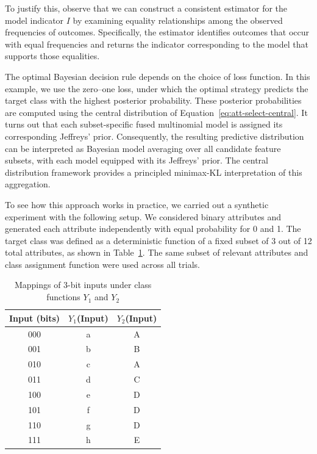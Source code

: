 To justify this, observe that we can construct a consistent estimator for the model indicator $I$ by examining
equality relationships among the observed frequencies of outcomes.
Specifically, the estimator identifies outcomes that occur with equal frequencies and returns the
indicator corresponding to the model that supports those equalities.

The optimal Bayesian decision rule depends on the choice of loss function.
In this example, we use the zero--one loss, under which the optimal strategy predicts the target class with the highest
posterior probability.
These posterior probabilities are computed using the central distribution of Equation~\ref{eq:att-select-central}.
It turns out that each subset-specific fused multinomial model is assigned its corresponding
Jeffreys' prior.
Consequently, the resulting predictive distribution can be interpreted as Bayesian model averaging over all
candidate feature subsets, with each model equipped with its Jeffreys' prior.
The central distribution framework provides a principled minimax-KL interpretation of this aggregation.

To see how this approach works in practice, we carried out a synthetic experiment with the following setup.
We considered binary attributes and generated each attribute independently with equal probability for 0 and 1.
The target class was defined as a deterministic function of a fixed subset of 3 out of 12 total attributes, as
shown in Table~\ref{tab:functions}.
The same subset of relevant attributes and class assignment function were used across all trials.

\begin{table}[tb]
    \centering
    \caption{Mappings of 3-bit inputs under class functions $Y_1$ and $Y_2$}
    \begin{tabular}{ccc}
        \toprule
        Input (bits) & $Y_1$(Input) & $Y_2$(Input) \\
        \midrule
        000          & a            & A            \\
        001          & b            & B            \\
        010          & c            & A            \\
        011          & d            & C            \\
        100          & e            & D            \\
        101          & f            & D            \\
        110          & g            & D            \\
        111          & h            & E            \\
        \bottomrule
    \end{tabular}\label{tab:functions}
\end{table}

